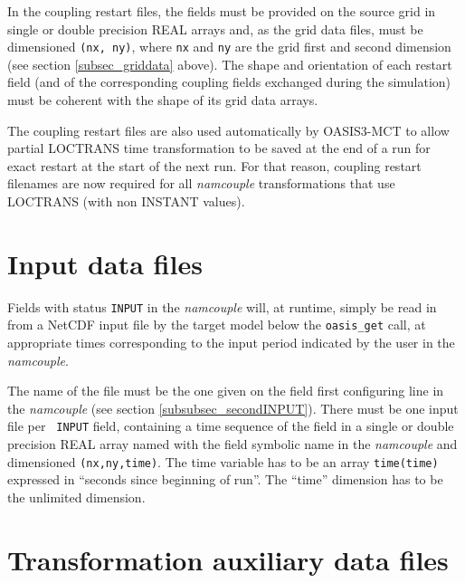 In the coupling restart files, the fields must be provided on the
source grid in single or double precision REAL arrays and, as the grid
data files, must be dimensioned {\tt (nx, ny)}, where {\tt nx} and
{\tt ny} are the grid first and second dimension (see section
\ref{subsec_griddata} above).  The shape and orientation of each
restart field (and of the corresponding coupling fields exchanged
during the simulation) must be coherent with the shape of its grid
data arrays.

The coupling restart files are also used automatically by OASIS3-MCT
to allow partial LOCTRANS time transformation to be saved at the end
of a run for exact restart at the start of the next run. For that
reason, coupling restart filenames are now required for all {\it
  namcouple} transformations that use LOCTRANS (with non INSTANT
values).

\section{Input data files}
\label{subsec_inputdata}

Fields with status {\tt INPUT} in the {\it namcouple} will, at
runtime, simply be read in from a NetCDF input file by the target
model below the {\tt oasis\_get} call, at appropriate times
corresponding to the input period indicated by the user in the {\it
  namcouple}.

The name of the file must be the one given on the field first
configuring line in the {\it namcouple} (see section
\ref{subsubsec_secondINPUT}). There must be one input file per {\tt
  INPUT} field, containing a time sequence of the field in a single or
double precision REAL array named with the field symbolic name in the
{\it namcouple} and dimensioned {\tt (nx,ny,time)}.  The time variable
has to be an array {\tt time(time)} expressed in ``seconds since
beginning of run''. The ``time'' dimension has to be the unlimited
dimension.


\section{Transformation auxiliary data files}
\label{subsec_mapdata}

